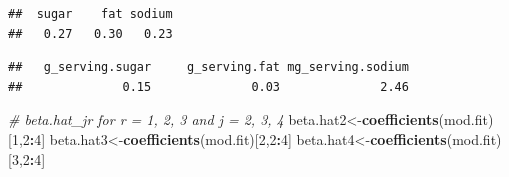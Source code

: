 \documentclass[11pt,]{article}
\newenvironment{Shaded}{\begin{snugshade}}{\end{snugshade}}
\newcommand{\KeywordTok}[1]{\textcolor[rgb]{0.13,0.29,0.53}{\textbf{#1}}}
\newcommand{\DataTypeTok}[1]{\textcolor[rgb]{0.13,0.29,0.53}{#1}}
\newcommand{\DecValTok}[1]{\textcolor[rgb]{0.00,0.00,0.81}{#1}}
\newcommand{\CommentTok}[1]{\textcolor[rgb]{0.56,0.35,0.01}{\textit{#1}}}
\newcommand{\OperatorTok}[1]{\textcolor[rgb]{0.81,0.36,0.00}{\textbf{#1}}}
\newcommand{\NormalTok}[1]{#1}
\begin{document}
\begin{verbatim}
##  sugar    fat sodium 
##   0.27   0.30   0.23
\end{verbatim}

\begin{Shaded}
\end{Shaded}

\begin{verbatim}
##   g_serving.sugar     g_serving.fat mg_serving.sodium 
##              0.15              0.03              2.46
\end{verbatim}

\begin{Shaded}
\begin{Highlighting}[]
\CommentTok{# beta.hat_jr for r = 1, 2, 3  and j = 2, 3, 4}
\NormalTok{beta.hat2<-}\KeywordTok{coefficients}\NormalTok{(mod.fit)[}\DecValTok{1}\NormalTok{,}\DecValTok{2}\OperatorTok{:}\DecValTok{4}\NormalTok{]}
\NormalTok{beta.hat3<-}\KeywordTok{coefficients}\NormalTok{(mod.fit)[}\DecValTok{2}\NormalTok{,}\DecValTok{2}\OperatorTok{:}\DecValTok{4}\NormalTok{]}
\NormalTok{beta.hat4<-}\KeywordTok{coefficients}\NormalTok{(mod.fit)[}\DecValTok{3}\NormalTok{,}\DecValTok{2}\OperatorTok{:}\DecValTok{4}\NormalTok{]}
\end{Highlighting}
\end{Shaded}
\end{document}
